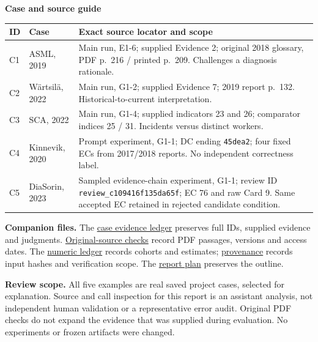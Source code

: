 \documentclass[11pt,a4paper]{article}
\newcommand{\subhead}[1]{\vspace{5pt}\textbf{#1}\par}
\begin{document}
\subhead{Case and source guide}
\begin{center}\footnotesize
\begin{tabularx}{\linewidth}{l l X}
\toprule
ID & Case & Exact source locator and scope\\
\midrule
C1 & ASML, 2019 & Main run, E1-6; supplied Evidence 2; original 2018 glossary, PDF p.~216 / printed p.~209. Challenges a diagnosis rationale.\\
C2 & W\"artsil\"a, 2022 & Main run, G1-2; supplied Evidence 7; 2019 report p.~132. Historical-to-current interpretation.\\
C3 & SCA, 2022 & Main run, G1-4; supplied indicators 23 and 26; comparator indices 25 / 31. Incidents versus distinct workers.\\
C4 & Kinnevik, 2020 & Prompt experiment, G1-1; DC ending \texttt{45dea2}; four fixed ECs from 2017/2018 reports. No independent correctness label.\\
C5 & DiaSorin, 2023 & Sampled evidence-chain experiment, G1-1; review ID \texttt{review\_c109416f135da65f}; EC 76 and raw Card 9. Same accepted EC retained in rejected candidate condition.\\
\bottomrule
\end{tabularx}
\end{center}

\textbf{Companion files.} The \href{case_evidence.json}{case evidence ledger} preserves full IDs, supplied evidence and judgments. \href{original_source_checks.json}{Original-source checks} record PDF passages, versions and access dates. The \href{numeric_ledger.json}{numeric ledger} records cohorts and estimates; \href{provenance.json}{provenance} records input hashes and verification scope. The \href{REPORT_PLAN.md}{report plan} preserves the outline.

\textbf{Review scope.} All five examples are real saved project cases, selected for explanation. Source and call inspection for this report is an assistant analysis, not independent human validation or a representative error audit. Original PDF checks do not expand the evidence that was supplied during evaluation. No experiments or frozen artifacts were changed.
\end{document}
